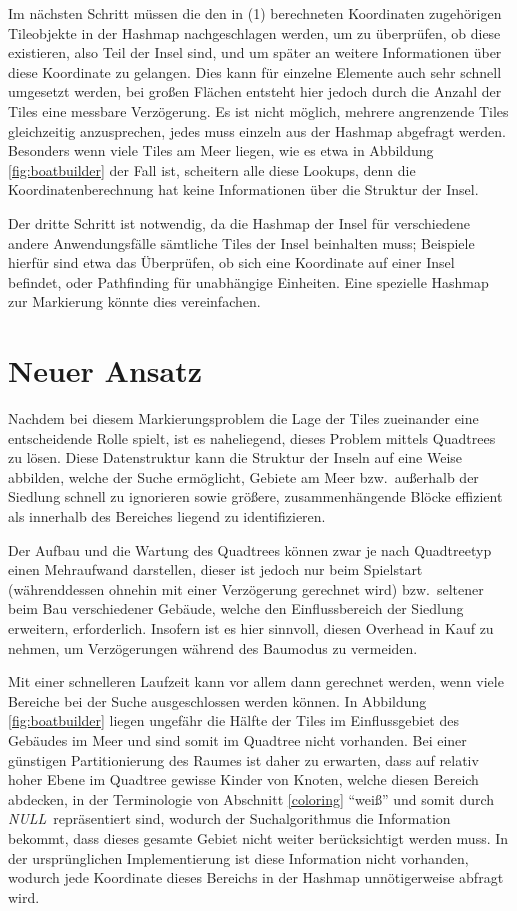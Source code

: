 \documentclass[%
			paper=a4,%
			DIV12,
			liststotoc,
			bibtotoc,
			draft=false,%
			titlepage,
			numbers=noendperiod
			]{scrartcl}
\newcommand{\mynull}{\textit{NULL}}
\begin{document}
Im nächsten Schritt müssen die den in (1) berechneten Koordinaten zugehörigen Tileobjekte in der Hashmap nachgeschlagen werden, um zu überprüfen, ob diese existieren, also Teil der Insel sind, und um später an weitere Informationen über diese Koordinate zu gelangen.
Dies kann für einzelne Elemente auch sehr schnell umgesetzt werden, bei großen Flächen entsteht hier jedoch durch die Anzahl der Tiles eine messbare Verzögerung.
Es ist nicht möglich, mehrere angrenzende Tiles gleichzeitig anzusprechen, jedes muss einzeln aus der Hashmap abgefragt werden.
Besonders wenn viele Tiles am Meer liegen, wie es etwa in Abbildung \ref{fig:boatbuilder} der Fall ist, scheitern alle diese Lookups, denn die Koordinatenberechnung hat keine Informationen über die Struktur der Insel.

Der dritte Schritt ist notwendig, da die Hashmap der Insel für verschiedene andere Anwendungsfälle sämtliche Tiles der Insel beinhalten muss; Beispiele hierfür sind etwa das Überprüfen, ob sich eine Koordinate auf einer Insel befindet, oder Pathfinding für unabhängige Einheiten.
Eine spezielle Hashmap zur Markierung könnte dies vereinfachen.

\section{Neuer Ansatz}
Nachdem bei diesem Markierungsproblem die Lage der Tiles zueinander eine entscheidende Rolle spielt, ist es naheliegend, dieses Problem mittels Quadtrees zu lösen.
Diese Datenstruktur kann die Struktur der Inseln auf eine Weise abbilden,
welche der Suche ermöglicht, Gebiete am Meer bzw.\ außerhalb der Siedlung schnell zu ignorieren sowie größere, zusammenhängende Blöcke effizient als innerhalb des Bereiches liegend zu identifizieren.

Der Aufbau und die Wartung des Quadtrees können zwar je nach Quadtreetyp einen Mehraufwand darstellen, dieser ist jedoch nur beim Spielstart (währenddessen ohnehin mit einer Verzögerung gerechnet wird) bzw.\ seltener beim Bau verschiedener Gebäude, welche den Einflussbereich der Siedlung erweitern, erforderlich.
Insofern ist es hier sinnvoll, diesen Overhead in Kauf zu nehmen, um Verzögerungen während des Baumodus zu vermeiden.

Mit einer schnelleren Laufzeit kann vor allem dann gerechnet werden, wenn viele Bereiche bei der Suche ausgeschlossen werden können.
In Abbildung \ref{fig:boatbuilder} liegen ungefähr die Hälfte der Tiles im Einflussgebiet des Gebäudes im Meer und sind somit im Quadtree nicht vorhanden.
Bei einer günstigen Partitionierung des Raumes ist daher zu erwarten, dass auf relativ hoher Ebene im Quadtree gewisse Kinder von Knoten, welche diesen Bereich abdecken, in der Terminologie von Abschnitt \ref{coloring} "`weiß"' und somit durch \mynull\ repräsentiert sind, wodurch der Suchalgorithmus die Information bekommt, dass dieses gesamte Gebiet nicht weiter berücksichtigt werden muss.
In der ursprünglichen Implementierung ist diese Information nicht vorhanden, wodurch jede Koordinate dieses Bereichs in der Hashmap unnötigerweise abfragt wird.
\end{document}
